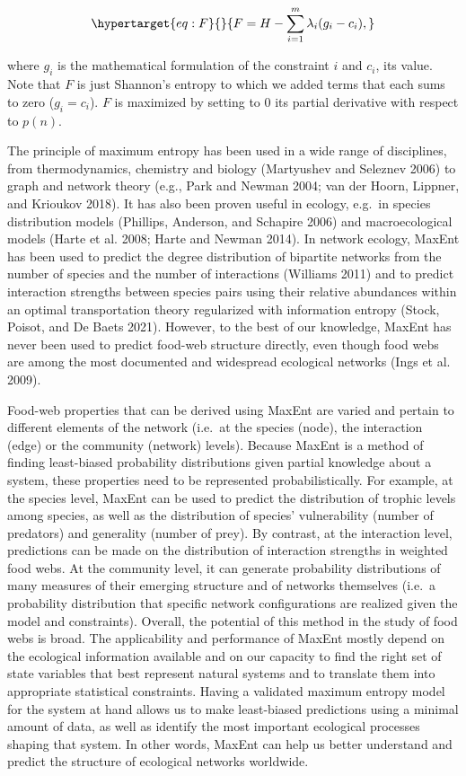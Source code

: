 \documentclass[11pt]{article}
\begin{document}
\begin{equation}\protect\hypertarget{eq:F}{}{F = H - \sum_{i=1}^m \lambda_i (g_i-c_i),}\label{eq:F}\end{equation}

where \(g_i\) is the mathematical formulation of the constraint \(i\)
and \(c_i\), its value. Note that \(F\) is just Shannon's entropy to
which we added terms that each sums to zero (\(g_i = c_i\)). \(F\) is
maximized by setting to \(0\) its partial derivative with respect to
\(p(n)\).

The principle of maximum entropy has been used in a wide range of
disciplines, from thermodynamics, chemistry and biology (Martyushev and
Seleznev 2006) to graph and network theory (e.g., Park and Newman 2004;
van der Hoorn, Lippner, and Krioukov 2018). It has also been proven
useful in ecology, e.g.~in species distribution models (Phillips,
Anderson, and Schapire 2006) and macroecological models (Harte et al.
2008; Harte and Newman 2014). In network ecology, MaxEnt has been used
to predict the degree distribution of bipartite networks from the number
of species and the number of interactions (Williams 2011) and to predict
interaction strengths between species pairs using their relative
abundances within an optimal transportation theory regularized with
information entropy (Stock, Poisot, and De Baets 2021). However, to the
best of our knowledge, MaxEnt has never been used to predict food-web
structure directly, even though food webs are among the most documented
and widespread ecological networks (Ings et al. 2009).

Food-web properties that can be derived using MaxEnt are varied and
pertain to different elements of the network (i.e.~at the species
(node), the interaction (edge) or the community (network) levels).
Because MaxEnt is a method of finding least-biased probability
distributions given partial knowledge about a system, these properties
need to be represented probabilistically. For example, at the species
level, MaxEnt can be used to predict the distribution of trophic levels
among species, as well as the distribution of species' vulnerability
(number of predators) and generality (number of prey). By contrast, at
the interaction level, predictions can be made on the distribution of
interaction strengths in weighted food webs. At the community level, it
can generate probability distributions of many measures of their
emerging structure and of networks themselves (i.e.~a probability
distribution that specific network configurations are realized given the
model and constraints). Overall, the potential of this method in the
study of food webs is broad. The applicability and performance of MaxEnt
mostly depend on the ecological information available and on our
capacity to find the right set of state variables that best represent
natural systems and to translate them into appropriate statistical
constraints. Having a validated maximum entropy model for the system at
hand allows us to make least-biased predictions using a minimal amount
of data, as well as identify the most important ecological processes
shaping that system. In other words, MaxEnt can help us better
understand and predict the structure of ecological networks worldwide.
\end{document}
